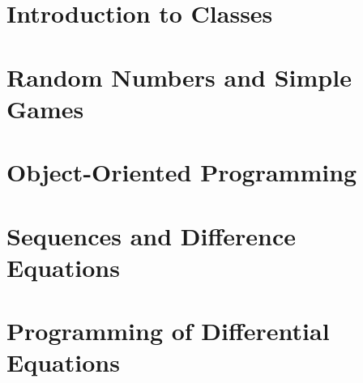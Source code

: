 \chapter{Introduction to Classes}

\chapter{Random Numbers and Simple Games}

\chapter{Object-Oriented Programming}


\appendix
\chapter{Sequences and Difference Equations}


\addtocounter{chapter}{3}
\chapter{Programming of Differential Equations}



\printbibliography

